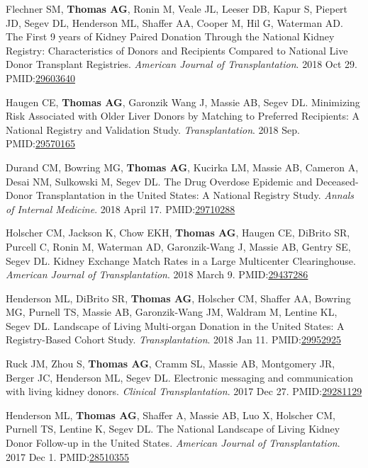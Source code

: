 \documentclass[10pt]{article}
\makeatletter
\newlength{\bibhang}
\newlength{\bibsep}
 {\@listi \global\bibsep\itemsep \global\advance\bibsep by\parsep}
\newenvironment{bibenum*}
  {\renewcommand\labelenumi{[\theenumi]}%
   \etaremune[
     topsep=0pt,
     itemsep=\bibsep,
     parsep=0pt,partopsep=0pt,
     itemindent=-\bibhang,
     leftmargin={\bibhang+\widthof{[999]}}]}
  {\endetaremune}
\newcommand{\pmid}[1]{PMID:\href{https://www.ncbi.nlm.nih.gov/pubmed/#1}{#1}}
\makeatother
\begin{document}
\begin{bibenum*}
\item Flechner SM, \textbf{Thomas AG}, Ronin M,
  Veale JL, Leeser DB, Kapur S, Piepert JD, Segev DL, Henderson ML,
  Shaffer AA, Cooper M, Hil G, Waterman AD.
  The First 9 years of Kidney Paired Donation Through the National Kidney
  Registry: Characteristics of Donors and Recipients Compared to National Live
  Donor Transplant Registries.
  \emph{American Journal of Transplantation}. 2018 Oct 29.
  \pmid{29603640} 

\item Haugen CE, \textbf{Thomas AG}, Garonzik Wang J, Massie AB,
  Segev DL. Minimizing Risk Associated with Older Liver Donors by
  Matching to Preferred Recipients: A National Registry and
  Validation Study.
  \emph{Transplantation}. 2018 Sep.
  \\\pmid{29570165} 

\item Durand CM\dag, Bowring MG\dag, \textbf{Thomas AG}, Kucirka LM,
  Massie AB, Cameron A, Desai NM, Sulkowski M, Segev DL.
  The Drug Overdose Epidemic and Deceased-Donor Transplantation
  in the United States: A National Registry Study.
  \emph{Annals of Internal Medicine}. 2018 April 17.
  \pmid{29710288} 

\item Holscher CM, Jackson K, Chow EKH, \textbf{Thomas AG}, Haugen CE,
  DiBrito SR, Purcell C, Ronin M, Waterman AD, Garonzik-Wang J, Massie AB,
  Gentry SE, Segev DL. Kidney Exchange Match Rates in a Large
  Multicenter Clearinghouse.
  \emph{American Journal of Transplantation}. 2018 March 9.
  \pmid{29437286} 

\item Henderson ML\dag, DiBrito SR\dag, \textbf{Thomas AG}, Holscher CM,
  Shaffer AA, Bowring MG, Purnell TS, Massie AB, Garonzik-Wang JM,
  Waldram M, Lentine KL, Segev DL.  Landscape of Living Multi-organ
  Donation in the United States: A Registry-Based Cohort Study.
  \emph{Transplantation}. 2018 Jan 11.
  \pmid{29952925} 

\item Ruck JM, Zhou S, \textbf{Thomas AG}, Cramm SL, Massie AB,
  Montgomery JR, Berger JC, Henderson ML, Segev DL.
  Electronic messaging and communication with living kidney donors.
  \emph{Clinical Transplantation}. 2017 Dec 27.
  \pmid{29281129} 

\item Henderson ML\dag, \textbf{Thomas AG\dag}, Shaffer A, Massie AB, Luo X,
  Holscher CM, Purnell TS, Lentine K, Segev DL. The National Landscape
  of Living Kidney Donor Follow-up in the United States.
  \emph{American Journal of Transplantation}. 2017 Dec 1.
  \pmid{28510355} 


\end{bibenum*}
\end{document}
